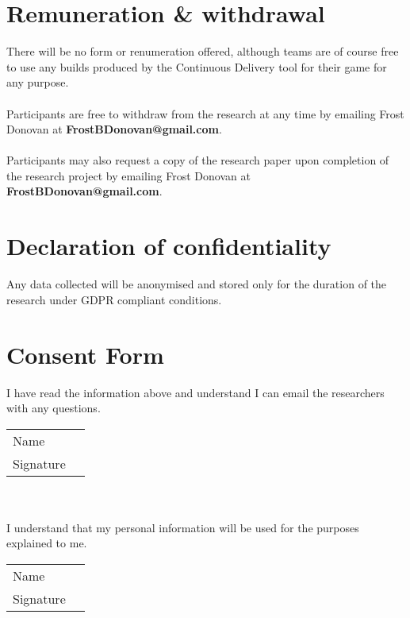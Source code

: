 \documentclass{article}
\begin{document}

    \section{Remuneration \& withdrawal}
        There will be no form or renumeration offered, although teams are of course free to use any builds produced by the Continuous Delivery tool for their game for any purpose.
        \\ \\
        Participants are free to withdraw from the research at any time by emailing Frost Donovan at \textbf{FrostBDonovan@gmail.com}. 
        \\ \\
        Participants may also request a copy of the research paper upon completion of the research project by emailing Frost Donovan at \textbf{FrostBDonovan@gmail.com}.
        
    \section{Declaration of confidentiality}
        Any data collected will be anonymised and stored only for the duration of the research under GDPR compliant conditions.

    \newpage

    \section{Consent Form}
        I have read the information above and understand I can email the researchers with any questions. \\

        \begin{tabular}{@{}p{.5in}p{3.5in}@{}}
            Name & \hrulefill \\
            Signature & \hrulefill \\
        \end{tabular} \\
        \\

        I understand that my personal information will be used for the purposes explained to me. \\

        \begin{tabular}{@{}p{.5in}p{3.5in}@{}}
            Name & \hrulefill \\
            Signature & \hrulefill \\
        \end{tabular} \\
        \\
\end{document}
